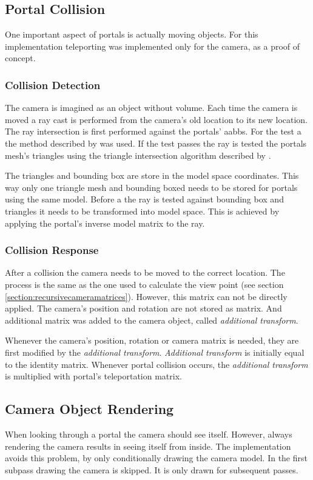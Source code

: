 \subsection{Portal Collision}
One important aspect of portals is actually moving objects. For this implementation teleporting was implemented only for the camera, as a proof of concept.

\subsubsection{Collision Detection}
The camera is imagined as an object without volume. Each time the camera is moved a ray cast is performed from the camera's old location to its new location. The ray intersection is first performed against the portals' \glspl{aabb}. For the test a the method described by \textcite{williams:2005:efficient} was used. If the test passes the ray is tested the portals mesh's triangles using the triangle intersection algorithm described by \textcite{moller:2005:fast}.


The triangles and bounding box are store in the model space coordinates. This way only one triangle mesh and bounding boxed needs to be stored for portals using the same model. Before a the ray is tested against bounding box and triangles it needs to be transformed into model space. This is achieved by applying the portal's inverse model matrix to the ray.

\subsubsection{Collision Response}

After a collision the camera needs to be moved to the correct location. The process is the same as the one used to calculate the view point (see section \ref{section:recursivecameramatrices}). However, this matrix can not be directly applied. The camera's position and rotation are not stored as matrix. And additional matrix was added to the camera object, called \textit{additional transform}.

Whenever the camera's position, rotation or camera matrix is needed, they are first modified by the \textit{additional transform}. \textit{Additional transform} is initially equal to the identity matrix. Whenever portal collision occurs, the \textit{additional transform} is multiplied with portal's teleportation matrix.



\subsection{Camera Object Rendering}
When looking through a portal the camera should see itself. However, always rendering the camera results in seeing itself from inside. The implementation avoids this problem, by only conditionally drawing the camera model. In the first subpass drawing the camera is skipped. It is only drawn for subsequent passes.




